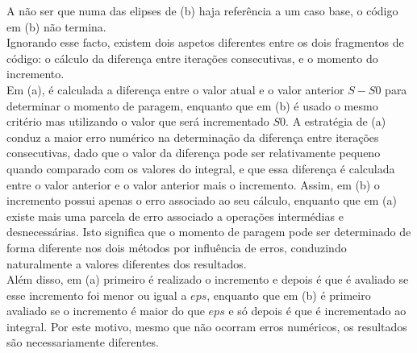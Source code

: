A não ser que numa das elipses de (b) haja referência a um caso base, o código em (b) não termina.\\
Ignorando esse facto, existem dois aspetos diferentes entre os dois fragmentos de código: o cálculo da diferença entre iterações consecutivas, e o momento do incremento.\\
Em (a), é calculada a diferença entre o valor atual e o valor anterior $S-S0$ para determinar o momento de paragem, enquanto que em (b) é usado o mesmo critério mas utilizando o valor que será incrementado $S0$. A estratégia de (a) conduz a maior erro numérico na determinação da diferença entre iterações consecutivas, dado que o valor da diferença pode ser relativamente pequeno quando comparado com os valores do integral, e que essa diferença é calculada entre o valor anterior e o valor anterior mais o incremento. Assim, em (b) o incremento possui apenas o erro associado ao seu cálculo, enquanto que em (a) existe mais uma parcela de erro associado a operações intermédias e desnecessárias. Isto significa que o momento de paragem pode ser determinado de forma diferente nos dois métodos por influência de erros, conduzindo naturalmente a valores diferentes dos resultados.\\
Além disso, em (a) primeiro é realizado o incremento e depois é que é avaliado se esse incremento foi menor ou igual a $eps$, enquanto que em (b) é primeiro avaliado se o incremento é maior do que $eps$ e só depois é que é incrementado ao integral. Por este motivo, mesmo que não ocorram erros numéricos, os resultados são necessariamente diferentes.
